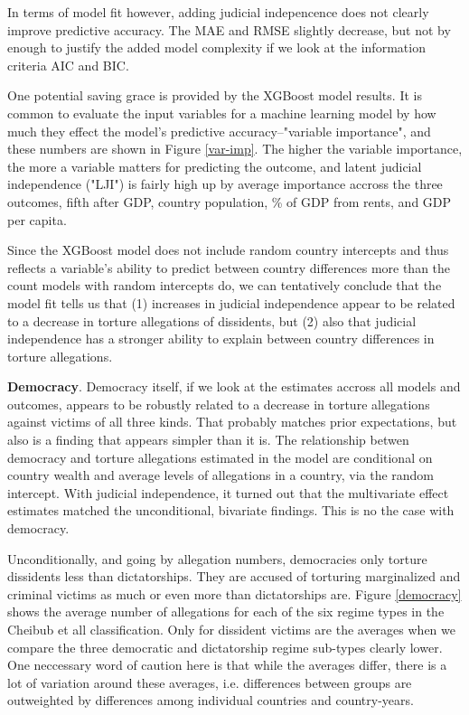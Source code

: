 \documentclass[12pt]{article}
\begin{document}
In terms of model fit however, adding judicial indepencence does not clearly improve predictive accuracy. The MAE and RMSE slightly decrease, but not by enough to justify the added model complexity if we look at the information criteria AIC and BIC. 

One potential saving grace is provided by the XGBoost model results. It is common to evaluate the input variables for a machine learning model by how much they effect the model's predictive accuracy--"variable importance", and these numbers are shown in Figure \ref{var-imp}. The higher the variable importance, the more a variable matters for predicting the outcome, and latent judicial independence ("LJI") is fairly high up by average importance accross the three outcomes, fifth after GDP, country population, \% of GDP from rents, and GDP per capita. 

Since the XGBoost model does not include random country intercepts and thus reflects a variable's ability to predict between country differences more than the count models with random intercepts do, we can tentatively conclude that the model fit tells us that (1) increases in judicial independence appear to be related to a decrease in torture allegations of dissidents, but (2) also that judicial independence has a stronger ability to explain between country differences in torture allegations. 

\textbf{Democracy}. Democracy itself, if we look at the estimates accross all models and outcomes, appears to be robustly related to a decrease in torture allegations against victims of all three kinds. That probably matches prior expectations, but also is a finding that appears simpler than it is. The relationship betwen democracy and torture allegations estimated in the model are conditional on country wealth and average levels of allegations in a country, via the random intercept. With judicial independence, it turned out that the multivariate effect estimates matched the unconditional, bivariate findings. This is no the case with democracy. 

Unconditionally, and going by allegation numbers, democracies only torture dissidents less than dictatorships. They are accused of torturing marginalized and criminal victims as much or even more than dictatorships are. Figure \ref{democracy} shows the average number of allegations for each of the six regime types in the Cheibub et all classification. Only for dissident victims are the averages when we compare the three democratic and dictatorship regime sub-types clearly lower. One neccessary word of caution here is that while the averages differ, there is a lot of variation around these averages, i.e. differences between groups are outweighted by differences among individual countries and country-years. 
\end{document}
